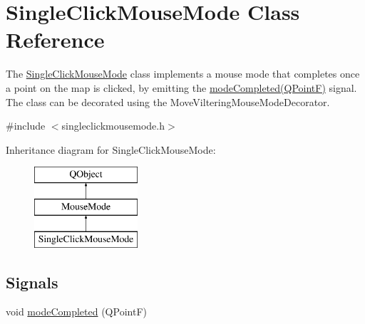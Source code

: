 \hypertarget{class_single_click_mouse_mode}{}\section{Single\+Click\+Mouse\+Mode Class Reference}
\label{class_single_click_mouse_mode}


The \mbox{\hyperlink{class_single_click_mouse_mode}{Single\+Click\+Mouse\+Mode}} class implements a mouse mode that completes once a point on the map is clicked, by emitting the \mbox{\hyperlink{class_single_click_mouse_mode_a0ff38b4cf1feb6d2d783eef5f0e68097}{mode\+Completed(\+Q\+Point\+F)}} signal. The class can be decorated using the Move\+Viltering\+Mouse\+Mode\+Decorator.  




{\ttfamily \#include $<$singleclickmousemode.\+h$>$}

Inheritance diagram for Single\+Click\+Mouse\+Mode\+:\begin{figure}[H]
\begin{center}
\leavevmode
\includegraphics[height=3.000000cm]{dc/d48/class_single_click_mouse_mode}
\end{center}
\end{figure}
\subsection*{Signals}
\begin{DoxyCompactItemize}
\item 
void \mbox{\hyperlink{class_single_click_mouse_mode_a0ff38b4cf1feb6d2d783eef5f0e68097}{mode\+Completed}} (Q\+PointF)
\end{DoxyCompactItemize}
